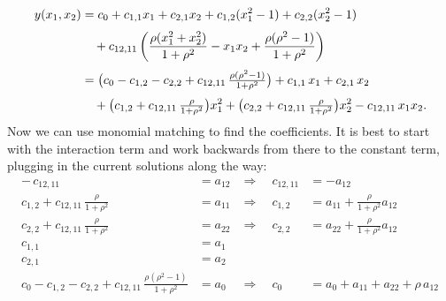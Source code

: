 \begin{align*}
y(x_1,x_2) &= c_0 + c_{1,1} x_1 + c_{2,1} x_2 
+ c_{1,2}(x_1^2 - 1) + c_{2,2}(x_2^2 - 1) \notag \\[3pt]
&\quad + c_{12, 11}\left( \frac{\rho(x_1^2 + x_2^2)}{1 + \rho^2} 
- x_1 x_2 
+ \frac{\rho(\rho^2 - 1)}{1 + \rho^2} \right) \\[3pt]
&= 
\big( c_0 - c_{1,2} - c_{2,2} + c_{12, 11}\,\tfrac{\rho(\rho^2 - 1)}{1+\rho^2} \big)
+ c_{1,1}\,x_1 
+ c_{2,1}\,x_2 \notag \\[3pt]
&\quad + \big( c_{1,2} + c_{12, 11}\,\tfrac{\rho}{1+\rho^2} \big) x_1^2
+ \big( c_{2,2} + c_{12, 11}\,\tfrac{\rho}{1+\rho^2} \big) x_2^2
- c_{12, 11}\, x_1 x_2.
\end{align*}
Now we can use monomial matching to find the coefficients. It is best to start with the interaction term and work backwards from there to the constant term, plugging in the current solutions along the way:
\begin{align*}
-\,c_{12, 11} &= a_{12} &\Rightarrow\quad c_{12, 11} &= -a_{12} \\[3pt]
c_{1,2} + c_{12, 11}\,\tfrac{\rho}{1+\rho^2} &= a_{11} 
&\Rightarrow\quad c_{1,2} &= a_{11} + \tfrac{\rho}{1+\rho^2}a_{12} \\[3pt]
c_{2,2} + c_{12, 11}\,\tfrac{\rho}{1+\rho^2} &= a_{22} 
&\Rightarrow\quad c_{2,2} &= a_{22} + \tfrac{\rho}{1+\rho^2}a_{12} \\[3pt]
c_{1,1} &= a_1 \\[3pt]
c_{2,1} &= a_2 \\[3pt]
c_0 - c_{1,2} - c_{2,2} + c_{12, 11}\,\tfrac{\rho(\rho^2 - 1)}{1+\rho^2} &= a_0 
&\Rightarrow\quad 
c_0 &= a_0 + a_{11} + a_{22} + \rho\,a_{12}
\end{align*}

